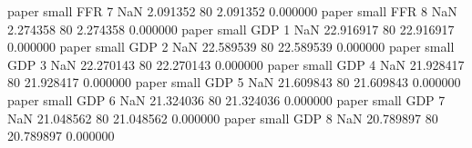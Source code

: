             paper      small      FFR                 7                  NaN  2.091352 80       2.091352           0.000000
            paper      small      FFR                 8                  NaN  2.274358 80       2.274358           0.000000
            paper      small      GDP                 1                  NaN 22.916917 80      22.916917           0.000000
            paper      small      GDP                 2                  NaN 22.589539 80      22.589539           0.000000
            paper      small      GDP                 3                  NaN 22.270143 80      22.270143           0.000000
            paper      small      GDP                 4                  NaN 21.928417 80      21.928417           0.000000
            paper      small      GDP                 5                  NaN 21.609843 80      21.609843           0.000000
            paper      small      GDP                 6                  NaN 21.324036 80      21.324036           0.000000
            paper      small      GDP                 7                  NaN 21.048562 80      21.048562           0.000000
            paper      small      GDP                 8                  NaN 20.789897 80      20.789897           0.000000